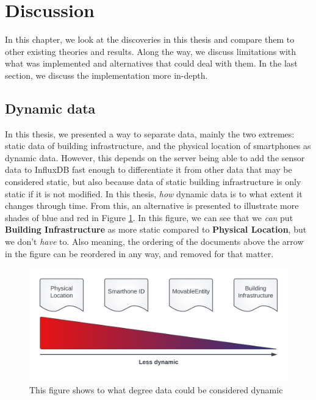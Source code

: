 \documentclass{article}
\begin{document}
\newpage
\section{Discussion}\label{sec:Discussion}
In this chapter, we look at the discoveries in this thesis and compare them to other existing theories and results. Along the way, we discuss limitations with what was implemented and alternatives that could deal with them. In the last section, we discuss the implementation more in-depth.

\subsection{Dynamic data}\label{subsec:DiscussDynamicData}
In this thesis, we presented a way to separate data, mainly the two extremes: static data of building infrastructure, and the physical location of smartphones as dynamic data. However, this depends on the server being able to add the sensor data to InfluxDB fast enough to differentiate it from other data that may be considered static, but also because data of static building infrastructure is only static if it is not modified. In this thesis, \emph{how} dynamic data is to what extent it changes through time. From this, an alternative is presented to illustrate more shades of blue and red in Figure \ref{fig:dynamic_arrow}. In this figure, we can see that we \emph{can} put \textbf{Building Infrastructure} as more static compared to \textbf{Physical Location}, but we don't \emph{have} to. Also meaning, the ordering of the documents above the arrow in the figure can be reordered in any way, and removed for that matter.

\begin{figure}[H]
    \centering
    \includegraphics[scale=0.16]{graphics/dynamic_arrow.png}
    \caption{This figure shows to what degree data could be considered dynamic}
    \label{fig:dynamic_arrow}
\end{figure}
\end{document}
